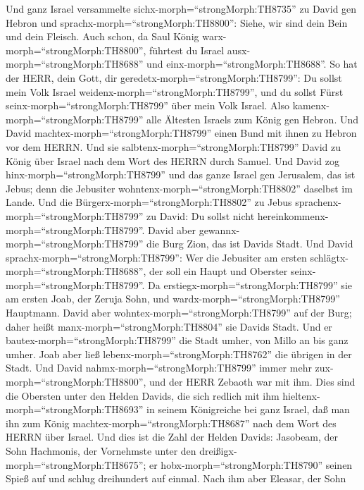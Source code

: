  Und ganz Israel versammelte
sichx-morph=``strongMorph:TH8735'' zu David gen Hebron und
sprachx-morph=``strongMorph:TH8800'': Siehe, wir sind dein Bein und dein
Fleisch.  Auch schon, da Saul König
warx-morph=``strongMorph:TH8800'', führtest du Israel
ausx-morph=``strongMorph:TH8688'' und einx-morph=``strongMorph:TH8688''.
So hat der HERR, dein Gott, dir geredetx-morph=``strongMorph:TH8799'':
Du sollst mein Volk Israel weidenx-morph=``strongMorph:TH8799'', und du
sollst Fürst seinx-morph=``strongMorph:TH8799'' über mein Volk Israel.
 Also kamenx-morph=``strongMorph:TH8799'' alle Ältesten
Israels zum König gen Hebron. Und David
machtex-morph=``strongMorph:TH8799'' einen Bund mit ihnen zu Hebron vor
dem HERRN. Und sie salbtenx-morph=``strongMorph:TH8799'' David zu König
über Israel nach dem Wort des HERRN durch Samuel.  Und David
zog hinx-morph=``strongMorph:TH8799'' und das ganze Israel gen
Jerusalem, das ist Jebus; denn die Jebusiter
wohntenx-morph=``strongMorph:TH8802'' daselbst im Lande. 
Und die Bürgerx-morph=``strongMorph:TH8802'' zu Jebus
sprachenx-morph=``strongMorph:TH8799'' zu David: Du sollst nicht
hereinkommenx-morph=``strongMorph:TH8799''. David aber
gewannx-morph=``strongMorph:TH8799'' die Burg Zion, das ist Davids
Stadt.  Und David sprachx-morph=``strongMorph:TH8799'': Wer
die Jebusiter am ersten schlägtx-morph=``strongMorph:TH8688'', der soll
ein Haupt und Oberster seinx-morph=``strongMorph:TH8799''. Da
erstiegx-morph=``strongMorph:TH8799'' sie am ersten Joab, der Zeruja
Sohn, und wardx-morph=``strongMorph:TH8799'' Hauptmann. 
David aber wohntex-morph=``strongMorph:TH8799'' auf der Burg; daher
heißt manx-morph=``strongMorph:TH8804'' sie Davids Stadt. 
Und er bautex-morph=``strongMorph:TH8799'' die Stadt umher, von Millo an
bis ganz umher. Joab aber ließ lebenx-morph=``strongMorph:TH8762'' die
übrigen in der Stadt.  Und David
nahmx-morph=``strongMorph:TH8799'' immer mehr
zux-morph=``strongMorph:TH8800'', und der HERR Zebaoth war mit ihm.
 Dies sind die Obersten unter den Helden Davids, die sich
redlich mit ihm hieltenx-morph=``strongMorph:TH8693'' in seinem
Königreiche bei ganz Israel, daß man ihn zum König
machtex-morph=``strongMorph:TH8687'' nach dem Wort des HERRN über
Israel.  Und dies ist die Zahl der Helden Davids: Jasobeam,
der Sohn Hachmonis, der Vornehmste unter den
dreißigx-morph=``strongMorph:TH8675''; er
hobx-morph=``strongMorph:TH8790'' seinen Spieß auf und schlug
dreihundert auf einmal.  Nach ihm aber Eleasar, der Sohn

